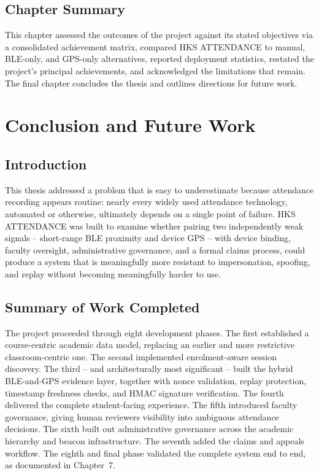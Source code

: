 \documentclass[12pt, a4paper, oneside]{report}
\begin{document}
\section{Chapter Summary}

This chapter assessed the outcomes of the project against its stated objectives via a consolidated achievement matrix, compared HKS ATTENDANCE to manual, BLE-only, and GPS-only alternatives, reported deployment statistics, restated the project's principal achievements, and acknowledged the limitations that remain. The final chapter concludes the thesis and outlines directions for future work.

\chapter{Conclusion and Future Work}
\label{chap:conclusion}

\section{Introduction}

This thesis addressed a problem that is easy to underestimate because attendance recording appears routine: nearly every widely used attendance technology, automated or otherwise, ultimately depends on a single point of failure. HKS ATTENDANCE was built to examine whether pairing two independently weak signals -- short-range BLE proximity and device GPS -- with device binding, faculty oversight, administrative governance, and a formal claims process, could produce a system that is meaningfully more resistant to impersonation, spoofing, and replay without becoming meaningfully harder to use.

\section{Summary of Work Completed}

The project proceeded through eight development phases. The first established a course-centric academic data model, replacing an earlier and more restrictive classroom-centric one. The second implemented enrolment-aware session discovery. The third -- and architecturally most significant -- built the hybrid BLE-and-GPS evidence layer, together with nonce validation, replay protection, timestamp freshness checks, and HMAC signature verification. The fourth delivered the complete student-facing experience. The fifth introduced faculty governance, giving human reviewers visibility into ambiguous attendance decisions. The sixth built out administrative governance across the academic hierarchy and beacon infrastructure. The seventh added the claims and appeals workflow. The eighth and final phase validated the complete system end to end, as documented in Chapter~7.
\end{document}
